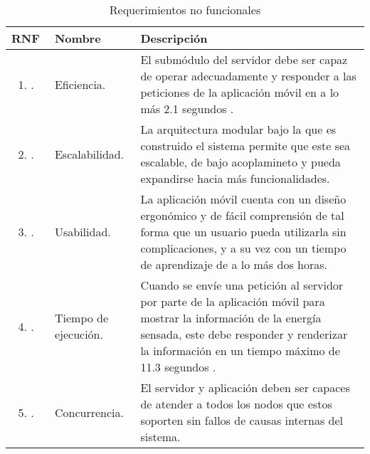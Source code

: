 \begin{longtable}{|M{1.6cm}|M{4.0cm}|M{6.0cm}|}
    \caption{Requerimientos no funcionales}
	\hline
	\textbf{RNF} & \textbf{Nombre} & \textbf{Descripción} \\
	\hline
 	\begin{enumerate}[label=RNF\arabic*]
 	    \item.
 	\end{enumerate}
 	& Eficiencia.
 	& El submódulo del servidor debe ser capaz de operar adecuadamente y responder a las peticiones de la aplicación móvil en a lo más 2.1 segundos \citep{AveragePageLoadTimes}.\\
    \hline
    \begin{enumerate}[label=RNF\arabic*]
        \setcounter{enumi}{1}
 	    \item.
 	\end{enumerate}
 	& Escalabilidad.
 	& La arquitectura modular bajo la que es construido el sistema permite que este sea escalable, de bajo acoplamineto y pueda expandirse hacia más funcionalidades.\\
    \hline
    \begin{enumerate}[label=RNF\arabic*]
        \setcounter{enumi}{2}
 	    \item.
 	\end{enumerate}
 	& Usabilidad. 
 	& La aplicación móvil cuenta con un diseño ergonómico y de fácil comprensión de tal forma que un usuario pueda utilizarla sin complicaciones, y a su vez con un tiempo de aprendizaje de a lo más dos horas.\\
    \hline
    \begin{enumerate}[label=RNF\arabic*]
        \setcounter{enumi}{3}
 	    \item.
 	\end{enumerate}
 	& Tiempo de ejecución.
 	& Cuando se envíe una petición al servidor por parte de la aplicación móvil para mostrar la información de la energía sensada, este debe responder y renderizar la información en un tiempo máximo de 11.3 segundos \citep{AveragePageLoadTimes}.  \\
    \hline
    \begin{enumerate}[label=RNF\arabic*]
        \setcounter{enumi}{4}
 	    \item.
 	\end{enumerate}
 	& Concurrencia.
 	& El servidor y aplicación deben ser capaces de atender a todos los nodos que estos soporten sin fallos de causas internas del sistema. \\
    \hline
\end{longtable}